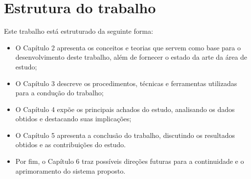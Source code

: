 \section{Estrutura do trabalho}
Este trabalho está estruturado da seguinte forma:

\begin{itemize}
    \item O Capítulo 2 apresenta os conceitos e teorias que servem como base para o desenvolvimento deste trabalho, além de fornecer o estado da arte da área de estudo;
    \item O Capítulo 3 descreve os procedimentos, técnicas e ferramentas utilizadas para a condução do trabalho;
    \item O Capítulo 4 expõe os principais achados do estudo, analisando os dados obtidos e destacando suas implicações;
    \item O Capítulo 5 apresenta a conclusão do trabalho, discutindo os resultados obtidos e as contribuições do estudo.
    \item Por fim, o Capítulo 6 traz possíveis direções futuras para a continuidade e o aprimoramento do sistema proposto.
\end{itemize}

